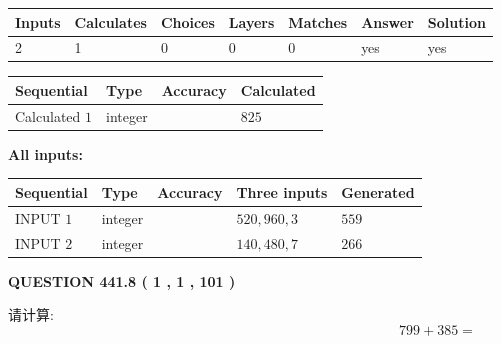 \documentclass{ctexart}
\begin{document}
 

 
   
   
   
   
\noindent\begin{tabular}{|l|l|l|l|l|l|l|}
 \hline
Inputs & Calculates & Choices & Layers & Matches & Answer & Solution \\ \hline
 2  & 
 1  & 
 0
  & 
 0  & 
 0  & 
  yes & 
  yes 
  \\ \hline
 \end{tabular}
   
   
   
   
\noindent{}
   
   
  
  
\noindent\begin{tabular}{|l|l|l|l|}
\hline
 Sequential & Type & Accuracy & Calculated \\ 
\hline
 
 
  Calculated $  1 $ & integer &  & 
  $ 825 $ 
 \\  \hline  
 \end{tabular}
   
   
   
   
\noindent\vspace{0.1in}\hspace{-0.08in} {\textbf{\Large{All inputs: }}}
   
   
  
  
\noindent\begin{tabular}{|l|l|l|l|l|}
\hline
 Sequential & Type & Accuracy & Three inputs & Generated \\ 
\hline
 
 
  INPUT $  1 $ & integer &  & $
 520
 , 
 960
 , 
 3
 $ & $ 559 $ 
 \\  \hline  
 
 
  INPUT $  2 $ & integer &  & $
 140
 , 
 480
 , 
 7
 $ & $ 266 $ 
 \\  \hline  
 \end{tabular}
   
   
  
\vspace{0.2in}
  
{\textbf{\Large{QUESTION
441.8 
 ( 1 , 1 , 101 )
}}}
  
  
 
请计算:
\begin{equation}
799 +  %
385 = \nonumber
\end{equation}
 
\end{document}
